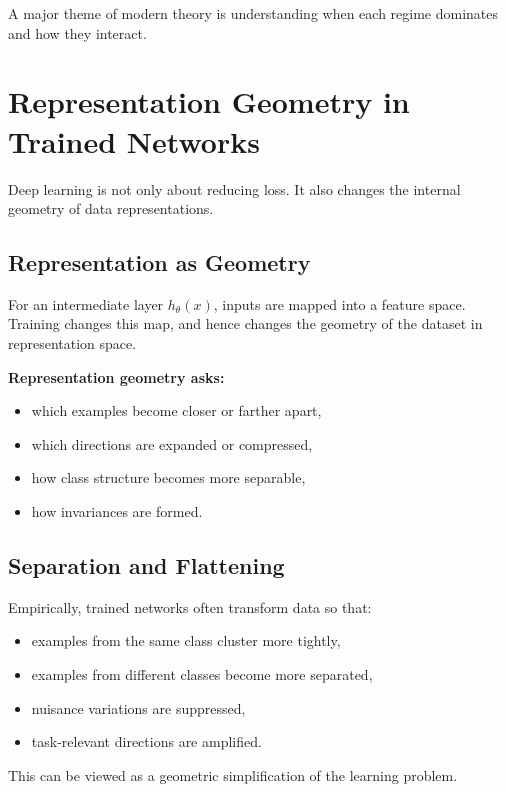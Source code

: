\medskip

\noindent
A major theme of modern theory is understanding when each regime dominates and how they interact.

\section{Representation Geometry in Trained Networks}

Deep learning is not only about reducing loss. It also changes the internal geometry of data representations.

\subsection{Representation as Geometry}

For an intermediate layer \(h_\theta(x)\), inputs are mapped into a feature space. Training changes this map, and hence changes the geometry of the dataset in representation space.

\medskip

\noindent
\textbf{Representation geometry asks:}
\begin{itemize}
    \item which examples become closer or farther apart,
    \item which directions are expanded or compressed,
    \item how class structure becomes more separable,
    \item how invariances are formed.
\end{itemize}

\subsection{Separation and Flattening}

Empirically, trained networks often transform data so that:
\begin{itemize}
    \item examples from the same class cluster more tightly,
    \item examples from different classes become more separated,
    \item nuisance variations are suppressed,
    \item task-relevant directions are amplified.
\end{itemize}

\medskip

\noindent
This can be viewed as a geometric simplification of the learning problem.

